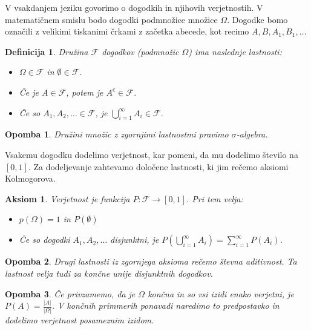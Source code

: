 \documentclass[10pt, a4paper]{article}
\newtheorem{defi}[izr]{Definicija}
\newtheorem{aksiom}{Aksiom}[section]
\newenvironment{noticeB}{%
  \tcolorbox[%
  notitle,
  empty,
  enhanced,  %
  breakable,
  coltext=black,
  colback=white, 
  fontupper=\rmfamily,
  parbox=false,
  noparskip,
  sharp corners,
  boxrule=-1pt,  %
  frame hidden,
  left=7pt,  %
  right=7pt,
  top=5pt,
  bottom=5pt,
  before skip=2.5ex plus 2pt,
  after skip=2.5ex plus 2pt,
  borderline west = {1.5pt}{-0.1pt}{blue!30!black}, %
  overlay unbroken and last={%
    \draw[color=black, line width=1.25pt]
    ($(frame.south west)+(1.pt, -0.1pt)$) -- ++(2em, 0);
  }
  ]}
{\endtcolorbox}
\newenvironment{definicija}{\begin{defi}\begin{noticeB}}{%
    \end{noticeB}\end{defi}}
\newtheorem*{opomba}{Opomba}
\begin{document}
V vsakdanjem jeziku govorimo o dogodkih in njihovih verjetnostih.
V matematičnem smislu bodo dogodki podmnožice množice $\Omega$.
Dogodke bomo označili z velikimi tiskanimi črkami z začetka abecede, kot recimo 
$A, B, A_1, B_1, \dots$

\begin{definicija}
    Družina $\mathcal{F}$ dogodkov (podmnožic $\Omega$) ima naslednje lastnosti:
    \begin{itemize}
        \item $\Omega \in \mathcal{F}$ in $\emptyset \in \mathcal{F}$.
        \item Če je $A \in \mathcal{F}$, potem je $A^{\mathsf{c}} \in \mathcal{F}$.
        \item Če so $A_1, A_2, \dots \in \mathcal{F}$, je $\bigcup_{i = 1} ^\infty A_i \in \mathcal{F}$.
    \end{itemize}
\end{definicija}

\begin{opomba}
    Družini množic z zgornjimi lastnostmi pravimo $\sigma$-algebra.
\end{opomba}

Vsakemu dogodku dodelimo verjetnost, kar pomeni, da mu dodelimo število na $[0, 1]$.
Za dodeljevanje zahtevamo določene lastnosti, ki jim rečemo aksiomi Kolmogorova.

\begin{aksiom}
    Verjetnost je funkcija $P: \mathcal{F} \to [0, 1]$. Pri tem velja:
    \begin{itemize}
        \item $p(\Omega) = 1$ in $P(\emptyset)$
        \item Če so dogodki $A_1, A_2, \dots$ disjunktni, je $P \left(\bigcup_{i = 1} ^\infty A_i\right) = \sum_{i = 1} ^\infty P(A_i)$.
    \end{itemize}
\end{aksiom}

\begin{opomba}
    Drugi lastnosti iz zgornjega aksioma rečemo števna aditivnost.
    Ta lastnost velja tudi za končne unije disjunktnih dogodkov.
\end{opomba}

\begin{opomba}
    Če privzamemo, da je $\Omega$ končna in so vsi izidi enako verjetni, je $P(A) = \frac{|A|}{|\Omega|}$.
    V končnih primmerih ponavadi naredimo to predpostavko in dodelimo verjetnost posameznim izidom.
\end{opomba}
\end{document}
